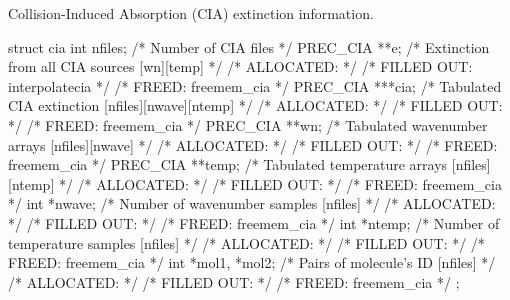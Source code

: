 \documentclass[letterpaper,12pt]{article}
\begin{document}
\noindent
Collision-Induced Absorption (CIA) extinction information.
\begin{plain}
struct cia{
  int nfiles;       /* Number of CIA files                                  */
  PREC_CIA **e;     /* Extinction from all CIA sources [wn][temp]           */
    /* ALLOCATED:							    */
    /* FILLED OUT: interpolatecia					    */
    /* FREED: freemem_cia						    */ 
  PREC_CIA ***cia;  /* Tabulated CIA extinction      [nfiles][nwave][ntemp] */
    /* ALLOCATED:							    */
    /* FILLED OUT:							    */
    /* FREED: freemem_cia						    */ 
  PREC_CIA **wn;    /* Tabulated wavenumber  arrays  [nfiles][nwave]        */
    /* ALLOCATED:							    */
    /* FILLED OUT:							    */
    /* FREED: freemem_cia						    */ 
  PREC_CIA **temp;  /* Tabulated temperature arrays  [nfiles][ntemp]        */
    /* ALLOCATED:							    */
    /* FILLED OUT:							    */
    /* FREED: freemem_cia						    */ 
  int *nwave;       /* Number of wavenumber samples  [nfiles]               */
    /* ALLOCATED:							    */
    /* FILLED OUT:							    */
    /* FREED: freemem_cia						    */ 
  int *ntemp;       /* Number of temperature samples [nfiles]               */
    /* ALLOCATED:							    */
    /* FILLED OUT:							    */
    /* FREED: freemem_cia						    */ 
  int *mol1, *mol2; /* Pairs of molecule's ID        [nfiles]               */
    /* ALLOCATED:							    */
    /* FILLED OUT:							    */
    /* FREED: freemem_cia						    */ 
};
\end{plain}
\end{document}
